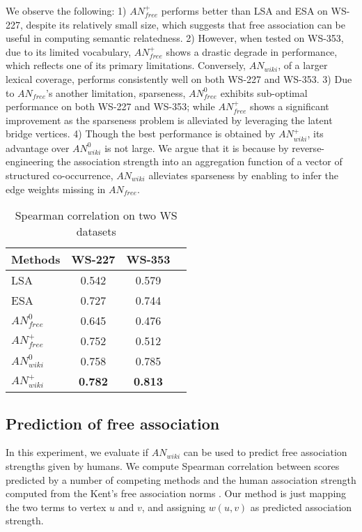 \documentclass[letterpaper]{article}
\begin{document}
We observe the following:
1) $AN_{free}^+$ performs better than LSA and ESA on WS-227,
despite its relatively small size, which suggests that free
association can be useful in computing semantic relatedness.
2) However, when tested on WS-353, due to its limited vocabulary,
$AN_{free}^+$ shows a drastic degrade in performance, which reflects
one of its primary limitations. Conversely, $AN_{wiki}$, of a larger lexical
coverage, performs consistently well on both WS-227 and WS-353.
3) Due to $AN_{free}$'s another limitation, sparseness, $AN_{free}^0$ 
exhibits sub-optimal performance on both WS-227 and WS-353; while 
$AN_{free}^+$ shows a significant improvement as the sparseness 
problem is alleviated by leveraging the latent bridge vertices. 
4) Though the best performance is obtained by $AN_{wiki}^+$, its advantage
over $AN_{wiki}^0$ is not large. We argue that it is because by 
reverse-engineering the association strength into an aggregation 
function of a vector of structured co-occurrence,
$AN_{wiki}$ alleviates sparseness by enabling to infer the edge weights missing 
in $AN_{free}$. 

\begin{table}[ht]
\centering
\caption{Spearman correlation on two WS datasets}
\begin{tabular}{lccc}
\hline
Methods & WS-227 & WS-353 \\
\hline
LSA & 0.542 & 0.579 \\
ESA & 0.727 & 0.744 \\
$AN_{free}^0$ & 0.645 & 0.476 \\
$AN_{free}^+$ & 0.752 & 0.512 \\
$AN_{wiki}^0$ & 0.758 & 0.785 \\
$AN_{wiki}^+$ & {\bf0.782} & {\bf0.813} \\
\hline
\end{tabular}
\label{tab:ws227}
\end{table}

\subsection{Prediction of free association}
\label{sec:predict}

In this experiment, we evaluate if $AN_{wiki}$ can be used to
predict free association strengths given by humans. We compute
Spearman correlation between scores predicted by a number of
competing methods \cite{asso09} and the human association strength
computed from the Kent's free association norms .
Our method is just mapping the two terms to vertex $u$ and $v$, and
assigning $w(u,v)$ as predicted association strength. 
\end{document}
